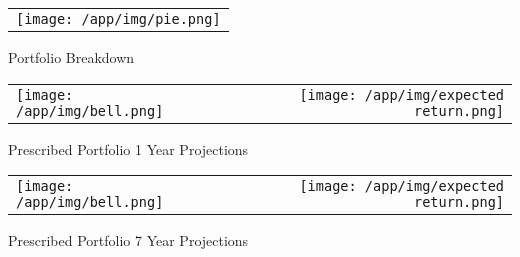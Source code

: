 \documentclass{article}
\begin{document}
\begin{adjustwidth}{-.3in}{0in}%
\vspace*{-1cm}

\begin{center}
  \begin{tabular}{c}
    \texttt{[image: /app/img/pie.png]}
  \end{tabular}
  \end{center}

  \begin{center}
        Portfolio Breakdown
  \end{center}

\vspace{.7cm}


\begin{center}
  \begin{tabular}{lcr}
  \texttt{[image: /app/img/bell.png]}
    & \hspace{1cm }&\texttt{[image: /app/img/expected return.png]}
  \end{tabular}
  \end{center}

  \begin{center}
      Prescribed Portfolio 1 Year Projections
  \end{center}

  \vspace{.7cm}


\begin{center}
  \begin{tabular}{lcr}
  \texttt{[image: /app/img/bell.png]}
    & \hspace{1cm }&\texttt{[image: /app/img/expected return.png]}
  \end{tabular}
  \end{center}

  \begin{center}
      Prescribed Portfolio 7 Year Projections
  \end{center}

\vspace{.6cm}

\end{adjustwidth}
\end{document}
